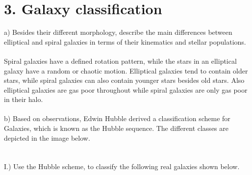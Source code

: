 \section*{3. Galaxy classification}

a) Besides their different morphology, describe the main differences between elliptical and spiral 
galaxies in terms of their kinematics and stellar populations.\\
\\
Spiral galaxies have a defined rotation pattern, while the stars in an elliptical galaxy have a random or
chaotic motion. Elliptical galaxies tend to contain older stars, while spiral galaxies can also contain
younger stars besides old stars. Also elliptical galaxies are gas poor throughout while spiral galaxies
are only gas poor in their halo.\\
\\
b) Based on observations, Edwin Hubble derived a classification scheme for Galaxies, which is known as the
Hubble sequence. The different classes are depicted in the image below.\\
\\
\noindent{}\\
I.) Use the Hubble scheme, to classify the following real galaxies shown below.\\
\\
\noindent{}\\
